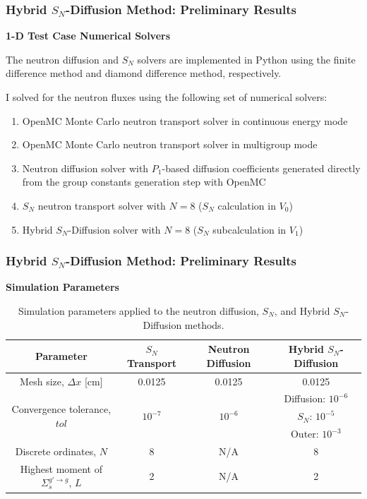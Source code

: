 \begin{frame}
  \frametitle{Hybrid $S_N$-Diffusion Method: Preliminary Results}
  \textbf{1-D Test Case Numerical Solvers}
  \vspace{.2cm}

  The neutron diffusion and $S_N$ solvers are implemented in Python using the finite difference
  method and diamond difference method, respectively.
  \vspace{.2cm}

  I solved for the neutron fluxes using the following set of numerical solvers:
  \begin{enumerate}
    \item OpenMC Monte Carlo neutron transport solver in continuous energy mode
    \item OpenMC Monte Carlo neutron transport solver in multigroup mode
    \item Neutron diffusion solver with $P_1$-based diffusion coefficients generated directly from
      the group constants generation step with OpenMC
    \item $S_N$ neutron transport solver with $N=8$ ($S_N$ calculation in $V_0$)
    \item Hybrid $S_N$-Diffusion solver with $N=8$ ($S_N$ subcalculation in $V_1$)
  \end{enumerate}
\end{frame}

\begin{frame}
  \frametitle{Hybrid $S_N$-Diffusion Method: Preliminary Results}
  \textbf{Simulation Parameters}
  \begin{table}
    \centering
    \footnotesize
    \caption{Simulation parameters applied to the neutron diffusion, $S_N$, and Hybrid
    $S_N$-Diffusion methods.}
    \begin{tabular}{c c c c}
      \toprule
      Parameter & $S_N$ Transport & Neutron Diffusion & Hybrid $S_N$-Diffusion \\
      \midrule
      Mesh size, $\Delta x$ [cm]        & 0.0125    & 0.0125    & 0.0125 \\[.2cm]
      \multirow{3}{*}{Convergence tolerance, $tol$}
                                        &           &           & Diffusion: $10^{-6}$ \\
                                        & $10^{-7}$ & $10^{-6}$ & $S_N$: $10^{-5}$ \\
                                        &           &           & Outer: $10^{-3}$ \\[.2cm]
      Discrete ordinates, $N$           & 8         & N/A       & 8 \\
      Highest moment of $\Sigma^{g'\rightarrow g}_s$, $L$
                                        & 2         & N/A       & 2 \\
      \bottomrule
    \end{tabular}
    \label{table:param}
  \end{table}
\end{frame}

